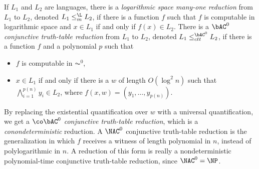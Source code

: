 If $L_1$ and $L_2$ are languages, there is a \emph{logarithmic space many-one reduction} from $L_1$ to $L_2$, denoted $L_1 \leq_m^{\L} L_2$, if there is a function $f$ such that $f$ is computable in logarithmic space and $x \in L_1$ if and only if $f(x) \in L_2$.
There is a \emph{$\bAC^0$ conjunctive truth-table reduction} from $L_1$ to $L_2$, denoted $L_1 \leq^{\bAC^0}_{ctt} L_2$, if there is a function $f$ and a polynomial $p$ such that
\begin{itemize}
\item $f$ is computable in $\AC^0$,
\item $x \in L_1$ if and only if there is a $w$ of length $O(\log^2 n)$ such that $\bigwedge_{i = 1}^{p(n)} y_i \in L_2$, where $f(x, w) = (y_1, \dotsc, y_{p(n)})$.
\end{itemize}
By replacing the existential quantification over $w$ with a universal quantification, we get a \emph{$\co\bAC^0$ conjunctive truth-table reduction}, which is a \emph{conondeterministic} reduction.
A $\NAC^0$ conjunctive truth-table reduction is the generalization in which $f$ receives a witness of length polynomial in $n$, instead of polylogarithmic in $n$.
A reduction of this form is really a nondeterministic polynomial-time conjunctive truth-table reduction, since $\NAC^0 = \NP$.

